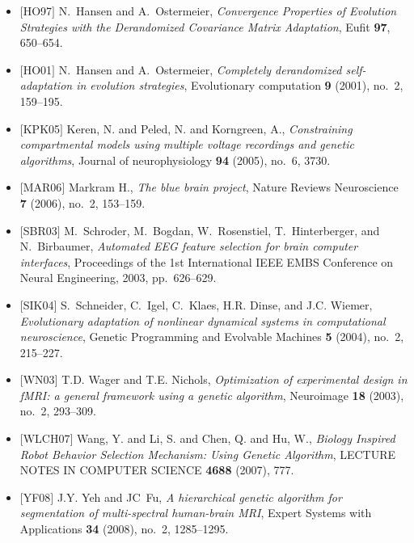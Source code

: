 \documentclass{beamer}
\begin{document}
\begin{frame}[allowframebreaks]
\begin{itemize}
    \item $[$HO97$]$
    N.~Hansen and A.~Ostermeier, \emph{{Convergence Properties of Evolution
      Strategies with the Derandomized Covariance Matrix Adaptation}},
      Eufit \textbf{97}, 650--654.

    \item $[$HO01$]$
    N.~Hansen and A.~Ostermeier, \emph{{Completely derandomized self-adaptation in evolution
      strategies}}, Evolutionary computation \textbf{9} (2001), no.~2, 159--195.

    \item $[$KPK05$]$
    Keren, N. and Peled, N. and Korngreen, A., \emph{{Constraining compartmental models using multiple voltage recordings and genetic algorithms}},
      Journal of neurophysiology \textbf{94} (2005), no.~6, 3730.

    \item $[$MAR06$]$
    Markram H., \emph{{The blue brain project}},
      Nature Reviews Neuroscience \textbf{7} (2006), no.~2, 153--159.

    \item $[$SBR03$]$
    M.~Schroder, M.~Bogdan, W.~Rosenstiel, T.~Hinterberger, and N.~Birbaumer,
      \emph{{Automated EEG feature selection for brain computer interfaces}},
      Proceedings of the 1st International IEEE EMBS Conference on Neural
      Engineering, 2003, pp.~626--629.

    \item $[$SIK04$]$
    S.~Schneider, C.~Igel, C.~Klaes, H.R. Dinse, and J.C. Wiemer,
      \emph{{Evolutionary adaptation of nonlinear dynamical systems in
      computational neuroscience}}, Genetic Programming and Evolvable Machines
      \textbf{5} (2004), no.~2, 215--227.

    \item $[$WN03$]$
    T.D. Wager and T.E. Nichols, \emph{{Optimization of experimental design in
      fMRI: a general framework using a genetic algorithm}}, Neuroimage \textbf{18}
      (2003), no.~2, 293--309.

    \item $[$WLCH07$]$
    Wang, Y. and Li, S. and Chen, Q. and Hu, W., \emph{{Biology Inspired Robot Behavior Selection Mechanism: Using Genetic Algorithm}},
    LECTURE NOTES IN COMPUTER SCIENCE \textbf{4688}
      (2007), 777.

    \item $[$YF08$]$
    J.Y. Yeh and JC~Fu, \emph{{A hierarchical genetic algorithm for segmentation of
      multi-spectral human-brain MRI}}, Expert Systems with Applications
      \textbf{34} (2008), no.~2, 1285--1295.
\end{itemize}
\end{frame}
\end{document}
